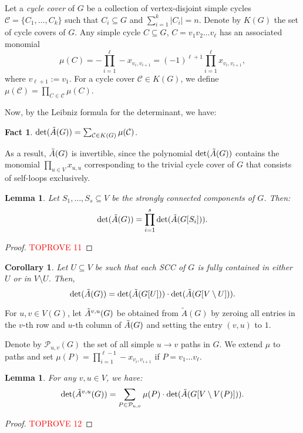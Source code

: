 \documentclass[11pt]{article}
\newtheorem{corollary}[theorem]{Corollary}
\newtheorem{lemma}[theorem]{Lemma}
\newtheorem{fact}{Fact}[subsection]
\begin{document}
{Let a \emph{cycle cover} of $G$ be a collection of vertex-disjoint simple cycles $\mathcal{C}=\{C_1,\ldots,C_k\}$
such that $C_i\subseteq G$ and $\sum_{i=1}^k|C_i|=n$.
Denote by $K(G)$ the set of cycle covers of $G$.
Any simple cycle $C\subseteq G$, $C=v_1v_2\ldots v_\ell$ has an associated monomial
$$\mu(C)=-\prod_{i=1}^\ell -x_{v_i,v_{i+1}}=(-1)^{\ell+1}\prod_{i=1}^\ell x_{v_i,v_{i+1}},$$
where $v_{\ell+1}:=v_1$. For a cycle cover $\mathcal{C}\in K(G)$, we define $\mu(\mathcal{C})=\prod_{C\in\mathcal{C}} \mu(C)$.

Now, by the Leibniz formula for the determinant, we have:
\begin{fact}\label{f:cycle-cover}
  $\det(\tilde{A}(G))=\sum_{\mathcal{C}\in K(G)} \mu(\mathcal{C})$.
\end{fact}
As a result, $\tilde{A}(G)$ is invertible, since the polynomial $\det(\tilde{A}(G))$
contains the monomial $\prod_{u\in V}x_{u,u}$
corresponding to the trivial cycle cover of $G$ that consists of
self-loops exclusively.

  
\begin{lemma}\label{l:det-scc}
  Let $S_1,\ldots,S_s\subseteq V$ be the strongly connected components of $G$. 
  Then:
  \begin{equation*}
      \det(\tilde{A}(G))=\prod_{i=1}^s \det(\tilde{A}(G[S_i])).
  \end{equation*}
\end{lemma}
\begin{proof}\textcolor{red}{TOPROVE 11}\end{proof}
\begin{corollary}\label{l:det-scc-split}
Let $U\subseteq V$ be such that each SCC of $G$
  is fully contained in either $U$ or in $V\setminus U$.
  Then, 
  \begin{equation*}
      \det(\tilde{A}(G))=\det(\tilde{A}(G[U]))\cdot \det(\tilde{A}(G[V\setminus U])).
  \end{equation*}
\end{corollary}


For $u,v\in V(G)$, let $\tilde{A}^{v,u}(G)$ be obtained from $\tilde{A}(G)$ by zeroing all entries
in the $v$-th row and $u$-th column of $\tilde{A}(G)$ and setting the entry $(v,u)$ to $1$.

Denote by $\mathcal{P}_{u,v}(G)$ the set of all simple $u\to v$ paths in $G$. We extend $\mu$ to paths and
set $\mu(P)=\prod_{i=1}^{\ell-1}-x_{v_i,v_{i+1}}$ if $P=v_1\ldots v_\ell$.

\begin{lemma}\label{l:sumpath}
  For any $v,u\in V$, we have:
  $$\det(\tilde{A}^{v,u}(G))=\sum_{P\in \mathcal{P}_{u,v}} \mu(P)\cdot \det(\tilde{A}(G[V\setminus V(P)])).$$
\end{lemma}
\begin{proof}\textcolor{red}{TOPROVE 12}\end{proof}

}
\end{document}
